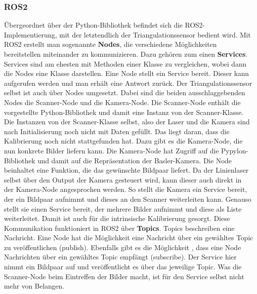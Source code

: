 		\subsubsection{ROS2}
		
		Übergeordnet über der Python-Bibliothek befindet sich die ROS2-Implementierung, mit der letztendlich der Triangulationssensor bedient wird. Mit ROS2 erstellt man sogenannte \textbf{Nodes}, die verschiedene Möglichkeiten bereitstellen miteinander zu kommunizieren. Dazu gehören zum einen \textbf{Services}. Services sind am ehesten mit Methoden einer Klasse zu vergleichen, wobei dann die Nodes eine Klasse darstellen. Eine Node stellt ein Service bereit. Dieser kann aufgerufen werden und man erhält eine Antwort zurück. Der Triangulationssensor selbst ist auch über Nodes umgesetzt. Dabei sind die beiden ausschlaggebenden Nodes die Scanner-Node und die Kamera-Node. Die Scanner-Node enthält die vorgestellte Python-Bibliothek und damit eine Instanz von der Scanner-Klasse. Die Instanzen von der Scanner-Klasse selbst, also der Laser und die Kamera sind nach Initialisierung noch nicht mit Daten gefüllt. Das liegt daran, dass die Kalibrierung noch nicht stattgefunden hat. Dazu gibt es die Kamera-Node, die nun konkrete Bilder liefern kann. Die Kamera-Node hat Zugriff auf die Pypylon-Bibliothek \citep{noauthor_getting_2022} und damit auf die Repräsentation der Basler-Kamera. Die Node beinhaltet eine Funktion, die das gewünschte Bildpaar liefert. Da der Linienlaser selbst über den Output der Kamera gesteuert wird, kann dieser auch direkt in der Kamera-Node angesprochen werden. So stellt die Kamera ein Service bereit, der ein Bildpaar aufnimmt und dieses an den Scanner weiterleiten kann. Genauso stellt sie einen Service bereit, der mehrere Bilder aufnimmt und diese als Liste weiterleitet. Damit ist auch für die intrinsische Kalibrierung gesorgt. \newline
		Diese Kommunikation funktioniert in ROS2 über \textbf{Topics}. Topics beschreiben eine Nachricht. Eine Node hat die Möglichkeit eine Nachricht über ein gewähltes Topic zu veröffentlichen (publish). Ebenfalls gibt es die Möglichkeit , dass eine Node Nachrichten über ein gewähltes Topic empfängt (subscribe). Der Service hier nimmt ein Bildpaar auf und veröffentlicht es über das jeweilige Topic. Was die Scanner-Node beim Eintreffen der Bilder macht, ist für den Service selbst nicht mehr von Belangen.\newline
